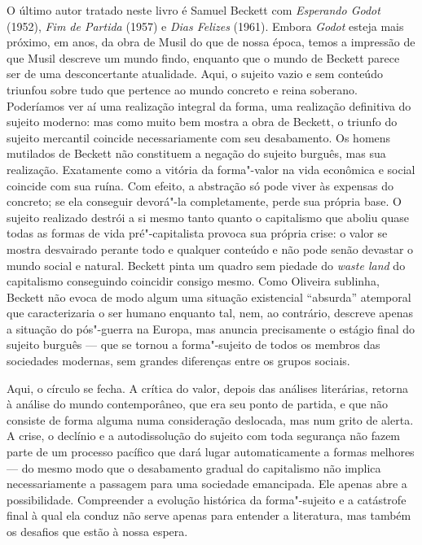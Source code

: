 O último autor tratado neste livro é Samuel Beckett com \emph{Esperando
Godot} (1952), \emph{Fim de Partida} (1957) e \emph{Dias Felizes}
(1961). Embora \emph{Godot} esteja mais próximo, em anos, da obra de
Musil do que de nossa época, temos a impressão de que Musil descreve um
mundo findo, enquanto que o mundo de Beckett parece ser de uma
desconcertante atualidade. Aqui, o sujeito vazio e sem conteúdo triunfou
sobre tudo que pertence ao mundo concreto e reina soberano. Poderíamos
ver aí uma realização integral da forma, uma realização definitiva do
sujeito moderno: mas como muito bem mostra a obra de Beckett, o triunfo
do sujeito mercantil coincide necessariamente com seu desabamento. Os
homens mutilados de Beckett não constituem a negação do sujeito burguês,
mas sua realização. Exatamente como a vitória da forma"-valor na vida
econômica e social coincide com sua ruína. Com efeito, a abstração só
pode viver às expensas do concreto; se ela conseguir devorá"-la
completamente, perde sua própria base. O sujeito realizado destrói a si
mesmo tanto quanto o capitalismo que aboliu quase todas as formas de
vida pré"-capitalista provoca sua própria crise: o valor se mostra desvairado perante
todo e qualquer conteúdo e não pode senão devastar o mundo social e
natural. Beckett pinta um quadro sem piedade do \emph{waste land} do
capitalismo conseguindo coincidir consigo mesmo. Como Oliveira sublinha,
Beckett não evoca de modo algum uma situação existencial ``absurda''
atemporal que caracterizaria o ser humano enquanto tal, nem, ao
contrário, descreve apenas a situação do pós"-guerra na Europa, mas
anuncia precisamente o estágio final do sujeito burguês --- que se tornou
a forma"-sujeito de todos os membros das sociedades modernas, sem grandes
diferenças entre os grupos sociais.

Aqui, o círculo se fecha. A crítica do valor, depois das análises
literárias, retorna à análise do mundo contemporâneo, que era seu ponto
de partida, e que não consiste de forma alguma numa consideração
deslocada, mas num grito de alerta. A crise, o declínio e a
autodissolução do sujeito com toda segurança não fazem parte de um
processo pacífico que dará lugar automaticamente a formas melhores --- do
mesmo modo que o desabamento gradual do capitalismo não implica
necessariamente a passagem para uma sociedade emancipada. Ele apenas
abre a possibilidade. Compreender a evolução histórica da forma"-sujeito
e a catástrofe final à qual ela conduz não serve apenas para entender a
literatura, mas também os desafios que estão à nossa espera.

